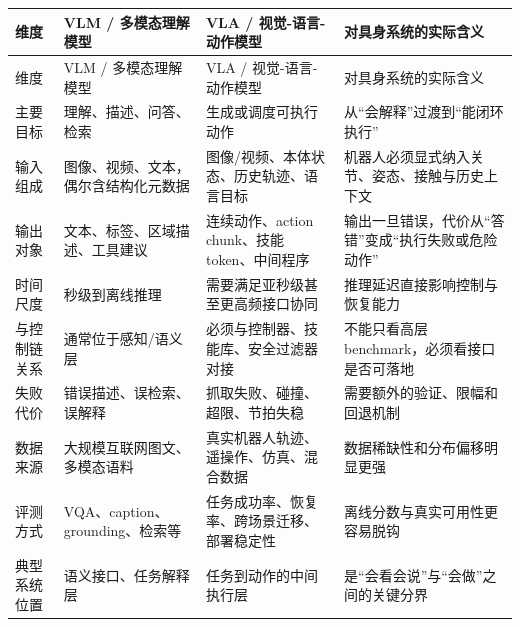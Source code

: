 \begingroup
\small
\begin{xltabular}{\textwidth}{YYYY}
\toprule
维度 & VLM / 多模态理解模型 & VLA / 视觉-语言-动作模型 & 对具身系统的实际含义 \\
\midrule
\endfirsthead
\toprule
维度 & VLM / 多模态理解模型 & VLA / 视觉-语言-动作模型 & 对具身系统的实际含义 \\
\midrule
\endhead
主要目标 & 理解、描述、问答、检索 & 生成或调度可执行动作 & 从“会解释”过渡到“能闭环执行” \\
输入组成 & 图像、视频、文本，偶尔含结构化元数据 & 图像/视频、本体状态、历史轨迹、语言目标 & 机器人必须显式纳入关节、姿态、接触与历史上下文 \\
输出对象 & 文本、标签、区域描述、工具建议 & 连续动作、action chunk、技能 token、中间程序 & 输出一旦错误，代价从“答错”变成“执行失败或危险动作” \\
时间尺度 & 秒级到离线推理 & 需要满足亚秒级甚至更高频接口协同 & 推理延迟直接影响控制与恢复能力 \\
与控制链关系 & 通常位于感知/语义层 & 必须与控制器、技能库、安全过滤器对接 & 不能只看高层 benchmark，必须看接口是否可落地 \\
失败代价 & 错误描述、误检索、误解释 & 抓取失败、碰撞、超限、节拍失稳 & 需要额外的验证、限幅和回退机制 \\
数据来源 & 大规模互联网图文、多模态语料 & 真实机器人轨迹、遥操作、仿真、混合数据 & 数据稀缺性和分布偏移明显更强 \\
评测方式 & VQA、caption、grounding、检索等 & 任务成功率、恢复率、跨场景迁移、部署稳定性 & 离线分数与真实可用性更容易脱钩 \\
典型系统位置 & 语义接口、任务解释层 & 任务到动作的中间执行层 & 是“会看会说”与“会做”之间的关键分界 \\
\bottomrule
\end{xltabular}
\endgroup
